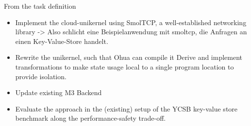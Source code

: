 From the task definition
\begin{itemize}
    \item Implement the cloud-unikernel using SmolTCP, a well-established networking library -> Also schlicht eine Beispielanwendung mit smoltcp, die Anfragen an einen Key-Value-Store handelt. 
    \item Rewrite the unikernel, such that Ohua can compile it Derive and implement transformations to make state usage local to a single program location to provide isolation.
    \item Update existing M3 Backend
    \item Evaluate the approach in the (existing) setup of the YCSB key-value store benchmark along the performance-safety trade-off. 
\end{itemize}


